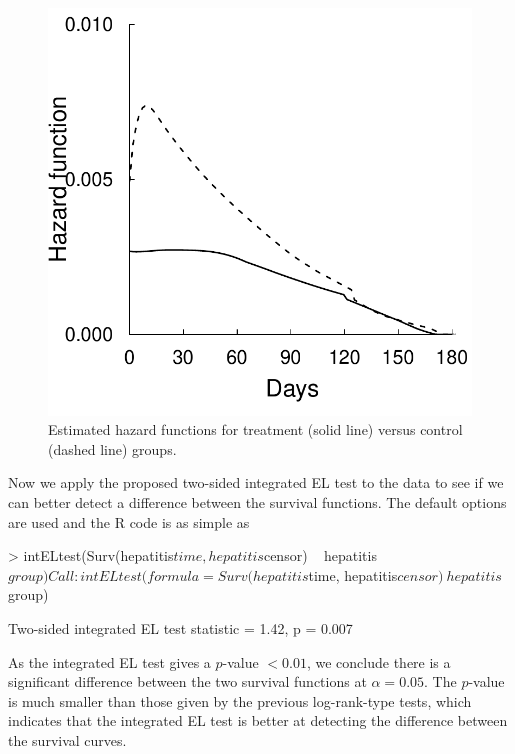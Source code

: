 \begin{figure}[H] %
	\centerline{\includegraphics[width=0.5\columnwidth]{figures/paper_survELtest_hep_haz_20191220.pdf}} %
	\caption{Estimated hazard functions
		for treatment (solid line) versus control (dashed line) groups.
	}
	\label{fig:hepatitis_haz}
\end{figure}
\noindent 



Now we apply the proposed two-sided integrated EL test
to the  data to see if we can better detect a difference between the survival functions. 
The default options are used and 
the R code is as simple as \\
\begin{example}
>   intELtest(Surv(hepatitis$time, hepatitis$censor) ~ hepatitis$group)

Call:
intELtest(formula = Surv(hepatitis$time, hepatitis$censor) ~ hepatitis$group)

Two-sided integrated EL test statistic = 1.42, p = 0.007
\end{example}
As the integrated EL test gives a $p$-value $<0.01$, we conclude there is a significant difference between the two survival functions at $\alpha=0.05$. The $p$-value is much smaller than those given by the previous log-rank-type tests, %
which indicates that the integrated EL test is better at detecting the difference between the survival curves.

